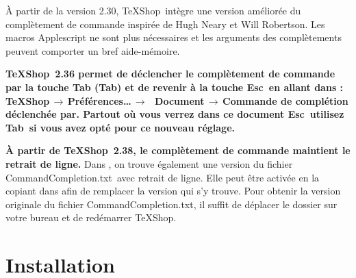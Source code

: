 \documentclass[11pt,french]{article}
\newcommand{\esckey}{\textsf{Esc}}
\newcommand{\tabkey}{\textsf{Tab}}
\newcommand{\mnu}[1]{\textsf{#1}}
\newcommand{\To}{\,\(\to\)\,}
\newcommand{\TS}{\textsf{\TeX Shop}}
\newcommand{\CCT}{\textsf{CommandCompletion.txt}}
\begin{document}
À partir de la version 2.30, \TS\ intègre une version améliorée du complètement de commande inspirée 
de Hugh Neary et Will Robertson. Les macros Applescript ne sont plus nécessaires et les arguments des 
complètements peuvent comporter un bref aide-mémoire.


{\bfseries\TS\ 2.36 permet de déclencher le complètement de commande par la touche Tab (\tabkey) et de revenir à la touche \esckey\ en allant dans : \mnu{TeXShop}\To\mnu{Préférences…}\To\ \mnu{Document}\To\mnu{Commande de complétion déclenchée par}. Partout où vous verrez dans ce document \esckey\ utilisez \tabkey\ si vous avez opté pour ce nouveau réglage.}


{\bfseries À partir de \TS\ 2.38, le complètement de commande maintient le retrait de ligne.} Dans , on trouve également une version du fichier \CCT\ avec retrait de ligne. Elle peut être activée en la copiant dans  afin de remplacer la version qui s'y trouve. Pour obtenir la version originale du fichier \CCT{}, il suffit de déplacer le dossier  sur votre bureau et de redémarrer \TS.



\section*{Installation}
\end{document}
